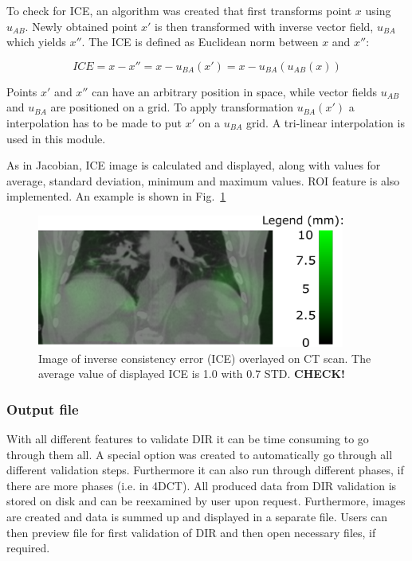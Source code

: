 \documentclass[type=dr, dr=rernat, accentcolor=tud7b,colorbacktitle, bigchapter, openright, twoside, 12pt ]{tudthesis}
\begin{document}
To check for ICE, an algorithm was created that first transforms point $x$ using $u_{AB}$. Newly obtained point $x'$ is then transformed with inverse vector
field, $u_{BA}$ which yields $x''$. The ICE is defined as Euclidean norm between $x$ and $x''$:

\begin{equation}
\label{eq:ice}
ICE = x - x'' = x - u_{BA}(x') = x - u_{BA}(u_{AB}(x))
\end{equation}

Points $x'$ and $x''$ can have an arbitrary position in space, while vector fields $u_{AB}$ and $u_{BA}$ are positioned on a grid. To apply transformation $u_{BA}(x')$ a interpolation has to be made to put $x'$ on a $u_{BA}$ grid. A tri-linear interpolation is used in this module.

As in Jacobian, ICE image is calculated and displayed, along with values for average, standard deviation, minimum and maximum values. ROI feature is also implemented. An example is shown in Fig.~\ref{inv}

\begin{figure}[H]
\begin{center}
\includegraphics[width=0.9\textwidth]{./Images/inv.png}
\caption{Image of inverse consistency error (ICE) overlayed on CT scan. The average value of displayed ICE is 1.0 with 0.7 STD. \textbf{CHECK!}}
\label{inv}
\end{center}
\end{figure}


\subsubsection{Output file}

With all different features to validate DIR it can be time consuming to go through them all. A special option was created to automatically go through all different validation steps. Furthermore it can also run through different phases, if there are more phases (i.e. in 4DCT). All produced data from DIR validation is stored on disk and can be reexamined by user upon request. Furthermore, images are created and data is summed up and displayed in a separate file. Users can then preview file for first validation of DIR and then open necessary files, if required.
\end{document}

